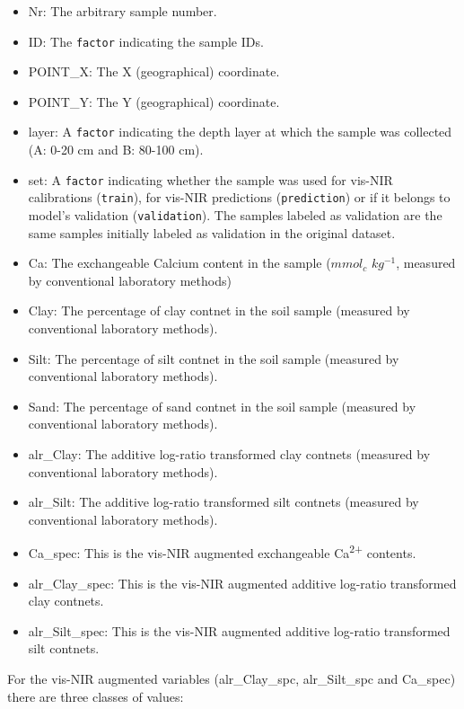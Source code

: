 \documentclass[]{book}
\providecommand{\tightlist}{%
  \setlength{\itemsep}{0pt}\setlength{\parskip}{0pt}}
\begin{document}
\begin{itemize}
\tightlist
\item
  Nr: The arbitrary sample number.
\item
  ID: The \texttt{factor} indicating the sample IDs.\\
\item
  POINT\_X: The X (geographical) coordinate.
\item
  POINT\_Y: The Y (geographical) coordinate.
\item
  layer: A \texttt{factor} indicating the depth layer at which the sample was collected (A: 0-20 cm and B: 80-100 cm).
\item
  set: A \texttt{factor} indicating whether the sample was used for vis-NIR calibrations (\texttt{train}), for vis-NIR predictions (\texttt{prediction}) or if it belongs to model's validation (\texttt{validation}). The samples labeled as validation are the same samples initially labeled as validation in the original dataset.
\item
  Ca: The exchangeable Calcium content in the sample (\(mmol_{c}\) \(kg^{−1}\), measured by conventional laboratory methods)
\item
  Clay: The percentage of clay contnet in the soil sample (measured by conventional laboratory methods).
\item
  Silt: The percentage of silt contnet in the soil sample (measured by conventional laboratory methods).
\item
  Sand: The percentage of sand contnet in the soil sample (measured by conventional laboratory methods).
\item
  alr\_Clay: The additive log-ratio transformed clay contnets (measured by conventional laboratory methods).
\item
  alr\_Silt: The additive log-ratio transformed silt contnets (measured by conventional laboratory methods).
\item
  Ca\_spec: This is the vis-NIR augmented exchangeable Ca\textsuperscript{2+} contents.
\item
  alr\_Clay\_spec: This is the vis-NIR augmented additive log-ratio transformed clay contnets.\\
\item
  alr\_Silt\_spec: This is the vis-NIR augmented additive log-ratio transformed silt contnets.
\end{itemize}

For the vis-NIR augmented variables (alr\_Clay\_spc, alr\_Silt\_spc and Ca\_spec) there are three classes of values:
\end{document}
